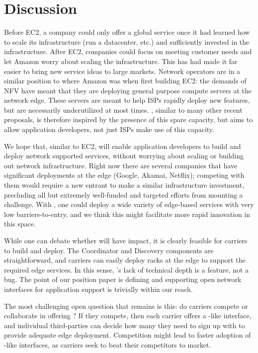 \section{Discussion}
\label{sec:discussion}

Before EC2, a company could only offer a global service once it had learned how to scale its infrastructure (\eg run a datacenter, etc.) and sufficiently invested in the infrastructure. After EC2, companies could focus on meeting customer needs and let Amazon worry about scaling the infrastructure. This has had made it far easier to bring new service ideas to large markets.  Network operators are in a similar position to where Amazon was when first building EC2: the demands of NFV have meant that they are deploying general purpose compute servers at the network edge. These servers are meant to help ISPs rapidly deploy new features, but are necessarily underutilized at most times. \name, similar to many other recent proposals, is therefore inspired by the presence of this spare capacity, but aims to allow application developers, not just ISPs make use of this capacity.

We hope that, similar to EC2, \name will enable application developers to build and deploy network supported services, without worrying about scaling or building out network infrastructure. Right now there are several companies that have significant deployments at the edge (\eg Google, Akamai, Netflix); competing with them would require a new entrant to make a similar infrastructure investment, precluding all but extremely well-funded and targeted efforts from mounting a challenge. With \name, one could deploy a wide variety of edge-based services with very low barriers-to-entry, and we think this might facilitate more rapid innovation in this space.

While one can debate whether \name will have impact, it is clearly feasible for carriers to build and deploy. The Coordinator and Discovery components are straightforward, and carriers can easily deploy racks at the edge to support the required edge services. In this sense, \name's lack of technical depth is a feature, not a bug. The point of our position paper is defining and supporting open network interfaces for application support is trivially within our reach.

The most challenging open question that remains is this: do carriers compete or collaborate in offering \name? If they compete, then each carrier offers a \name-like interface, and individual third-parties can decide how many they need to sign up with to provide adequate edge deployment. Competition might lead to faster adoption of \name-like interfaces, as carriers seek to beat their competitors to market. 

